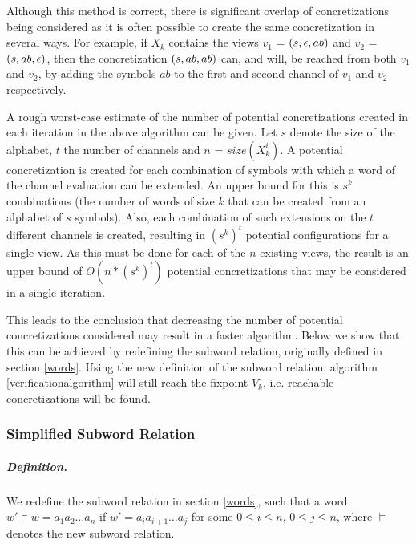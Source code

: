 Although this method is correct, there is significant overlap of concretizations being considered as it is often possible to create the same concretization  in several ways. For example, if $X_k$ contains the views $v_1$ = $(s, \epsilon, ab)$ and $v_2$ = $(s, ab, \epsilon)$, then the concretization $(s, ab,ab)$ can, and will, be reached from both $v_1$ and $v_2$, by adding the symbols $ab$ to the first and second channel of $v_1$ and $v_2$ respectively.

A rough worst-case estimate of the number of potential concretizations created in each iteration in the above algorithm can be given. Let $s$ denote the size of the alphabet, $t$ the number of channels and $n$ = $size(X_k^i)$. A potential concretization is created for each combination of symbols with which a word of the channel evaluation can be extended. An upper bound for this is $s^k$ combinations (the number of words of size $k$ that can be created from an alphabet of $s$ symbols). Also, each combination of such extensions on the $t$ different channels is created, resulting in $(s^k)^t$ potential configurations for a single view. As this must be done for each of the $n$ existing views, the result is an upper bound of $O(n*(s^k)^t)$ potential concretizations that may be considered in a single iteration.

This leads to the conclusion that decreasing the number of potential concretizations considered may result in a faster algorithm. Below we show that this can be achieved by redefining the subword relation, originally defined in section \ref{words}. Using the new definition of the subword relation, algorithm \ref{verificationalgorithm} will still reach the fixpoint $V_k$, i.e. reachable concretizations will be found.

\subsubsection{Simplified Subword Relation}

\subparagraph{Definition.} 
\label{newsubword}
We redefine the subword relation in section \ref{words}, such that a word $w' \models w = a_1a_2\ldots a_n$ if $w' = a_ia_{i+1}\ldots a_j$ for some $0 \leq i \leq n$, $0 \leq j \leq n$, where $\models$ denotes the new subword relation. 

